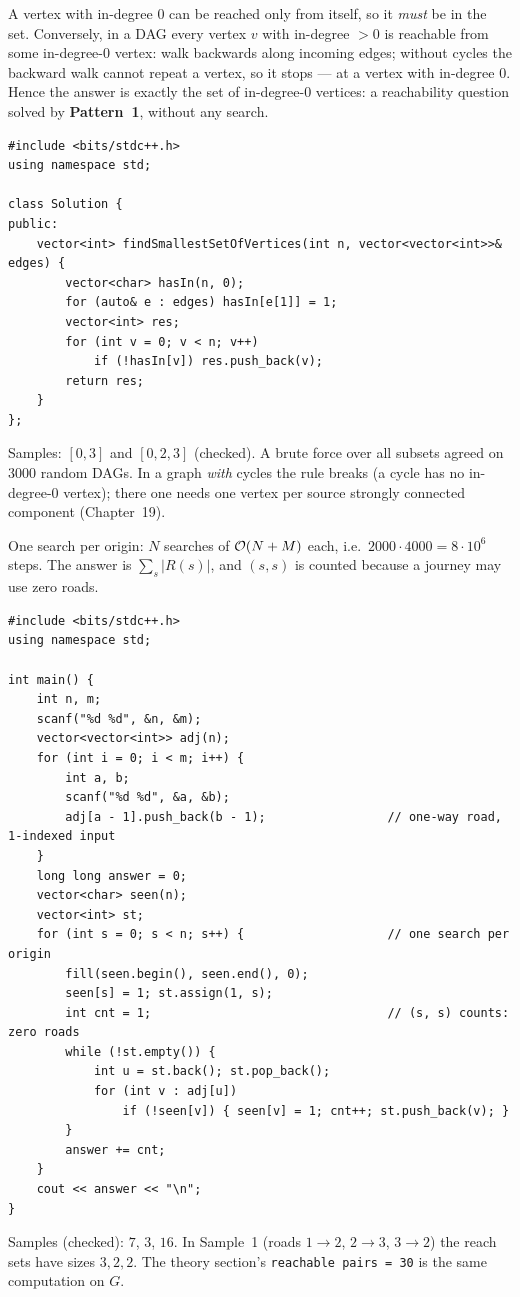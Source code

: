 \begin{solutionbox}
A vertex with in-degree 0 can be reached only from itself, so it \emph{must} be in the set. Conversely, in a DAG every vertex $v$ with in-degree $> 0$ is reachable from some in-degree-0 vertex: walk backwards along incoming edges; without cycles the backward walk cannot repeat a vertex, so it stops --- at a vertex with in-degree 0. Hence the answer is exactly the set of in-degree-0 vertices: a reachability question solved by \textbf{Pattern~1}, without any search.
\begin{lstlisting}[style=cpp]
#include <bits/stdc++.h>
using namespace std;

class Solution {
public:
    vector<int> findSmallestSetOfVertices(int n, vector<vector<int>>& edges) {
        vector<char> hasIn(n, 0);
        for (auto& e : edges) hasIn[e[1]] = 1;
        vector<int> res;
        for (int v = 0; v < n; v++)
            if (!hasIn[v]) res.push_back(v);
        return res;
    }
};
\end{lstlisting}
Samples: $[0,3]$ and $[0,2,3]$ (checked). A brute force over all subsets agreed on 3000 random DAGs. In a graph \emph{with} cycles the rule breaks (a cycle has no in-degree-0 vertex); there one needs one vertex per source strongly connected component (Chapter~19).
\end{solutionbox}

\begin{solutionbox}[E2.3 Tour]
One search per origin: $N$ searches of $\mathcal{O}(N + M)$ each, i.e.\ $2000 \cdot 4000 = 8\cdot 10^6$ steps. The answer is $\sum_s |R(s)|$, and $(s,s)$ is counted because a journey may use zero roads.
\begin{lstlisting}[style=cpp]
#include <bits/stdc++.h>
using namespace std;

int main() {
    int n, m;
    scanf("%d %d", &n, &m);
    vector<vector<int>> adj(n);
    for (int i = 0; i < m; i++) {
        int a, b;
        scanf("%d %d", &a, &b);
        adj[a - 1].push_back(b - 1);                 // one-way road, 1-indexed input
    }
    long long answer = 0;
    vector<char> seen(n);
    vector<int> st;
    for (int s = 0; s < n; s++) {                    // one search per origin
        fill(seen.begin(), seen.end(), 0);
        seen[s] = 1; st.assign(1, s);
        int cnt = 1;                                 // (s, s) counts: zero roads
        while (!st.empty()) {
            int u = st.back(); st.pop_back();
            for (int v : adj[u])
                if (!seen[v]) { seen[v] = 1; cnt++; st.push_back(v); }
        }
        answer += cnt;
    }
    cout << answer << "\n";
}
\end{lstlisting}
Samples (checked): $7$, $3$, $16$. In Sample~1 (roads $1{\to}2$, $2{\to}3$, $3{\to}2$) the reach sets have sizes $3, 2, 2$. The theory section's \texttt{reachable pairs = 30} is the same computation on $G$.
\end{solutionbox}

